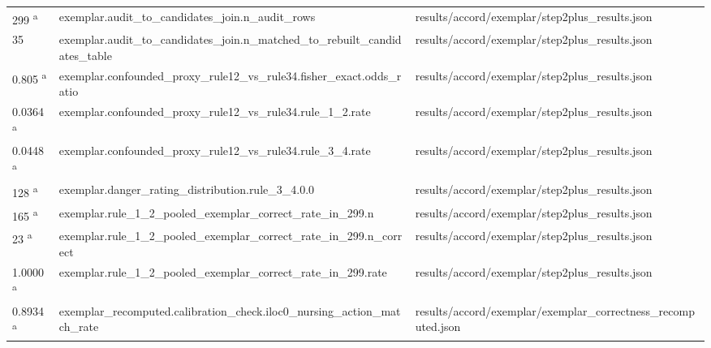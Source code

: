 \begin{longtable}{@{}p{0.7in}p{1.9in}p{2.6in}@{}}
299 \textsuperscript{a} & exemplar.\allowbreak{}audit\_to\_candidates\_join.\allowbreak{}n\_audit\_rows & results/\allowbreak{}accord/\allowbreak{}exemplar/\allowbreak{}step2plus\_results.\allowbreak{}json\\
35 & exemplar.\allowbreak{}audit\_to\_candidates\_join.\allowbreak{}n\_matched\_to\_rebuilt\_candidates\_table & results/\allowbreak{}accord/\allowbreak{}exemplar/\allowbreak{}step2plus\_results.\allowbreak{}json\\
0.805 \textsuperscript{a} & exemplar.\allowbreak{}confounded\_proxy\_rule12\_vs\_rule34.\allowbreak{}fisher\_exact.\allowbreak{}odds\_ratio & results/\allowbreak{}accord/\allowbreak{}exemplar/\allowbreak{}step2plus\_results.\allowbreak{}json\\
0.0364 \textsuperscript{a} & exemplar.\allowbreak{}confounded\_proxy\_rule12\_vs\_rule34.\allowbreak{}rule\_1\_2.\allowbreak{}rate & results/\allowbreak{}accord/\allowbreak{}exemplar/\allowbreak{}step2plus\_results.\allowbreak{}json\\
0.0448 \textsuperscript{a} & exemplar.\allowbreak{}confounded\_proxy\_rule12\_vs\_rule34.\allowbreak{}rule\_3\_4.\allowbreak{}rate & results/\allowbreak{}accord/\allowbreak{}exemplar/\allowbreak{}step2plus\_results.\allowbreak{}json\\
128 \textsuperscript{a} & exemplar.\allowbreak{}danger\_rating\_distribution.\allowbreak{}rule\_3\_4.\allowbreak{}0.\allowbreak{}0 & results/\allowbreak{}accord/\allowbreak{}exemplar/\allowbreak{}step2plus\_results.\allowbreak{}json\\
165 \textsuperscript{a} & exemplar.\allowbreak{}rule\_1\_2\_pooled\_exemplar\_correct\_rate\_in\_299.\allowbreak{}n & results/\allowbreak{}accord/\allowbreak{}exemplar/\allowbreak{}step2plus\_results.\allowbreak{}json\\
23 \textsuperscript{a} & exemplar.\allowbreak{}rule\_1\_2\_pooled\_exemplar\_correct\_rate\_in\_299.\allowbreak{}n\_correct & results/\allowbreak{}accord/\allowbreak{}exemplar/\allowbreak{}step2plus\_results.\allowbreak{}json\\
1.0000 \textsuperscript{a} & exemplar.\allowbreak{}rule\_1\_2\_pooled\_exemplar\_correct\_rate\_in\_299.\allowbreak{}rate & results/\allowbreak{}accord/\allowbreak{}exemplar/\allowbreak{}step2plus\_results.\allowbreak{}json\\
0.8934 \textsuperscript{a} & exemplar\_recomputed.\allowbreak{}calibration\_check.\allowbreak{}iloc0\_nursing\_action\_match\_rate & results/\allowbreak{}accord/\allowbreak{}exemplar/\allowbreak{}exemplar\_correctness\_recomputed.\allowbreak{}json\\

\end{longtable}
